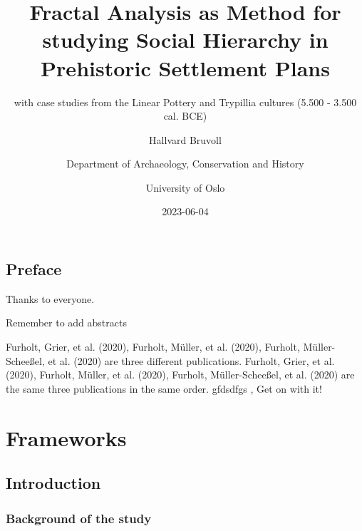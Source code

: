 \documentclass[
  12pt,
]{book}
\title{Fractal Analysis as Method for studying Social Hierarchy in Prehistoric Settlement Plans}
\subtitle{with case studies from the Linear Pottery and Trypillia cultures (5.500 - 3.500 cal. BCE)}
\author{Hallvard Bruvoll \and Department of Archaeology, Conservation and History \and University of Oslo}
\date{2023-06-04}
\begin{document}
\maketitle

{
\setcounter{tocdepth}{1}
\tableofcontents
}
\hypertarget{preface}{%
\chapter*{Preface}\label{preface}}

Thanks to everyone.

Remember to add abstracts

Furholt, Grier, et al. (2020), Furholt, Müller, et al. (2020), Furholt, Müller-Scheeßel, et al. (2020) are three different publications. Furholt, Grier, et al. (2020), Furholt, Müller, et al. (2020), Furholt, Müller-Scheeßel, et al. (2020) are the same three publications in the same order. gfdsdfgs , Get on with it!

\hypertarget{part-frameworks}{%
\part{Frameworks}\label{part-frameworks}}

\hypertarget{intro}{%
\chapter{Introduction}\label{intro}}

\hypertarget{background-of-the-study}{%
\section{Background of the study}\label{background-of-the-study}}
\end{document}
